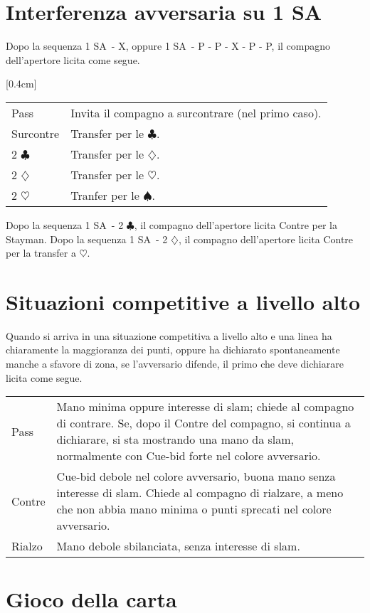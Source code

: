 \documentclass[a4paper,10pt]{article}
\renewcommand{\c}{$\clubsuit$\xspace}
\renewcommand{\d}{$\diamondsuit$\xspace}
\newcommand{\h}{$\heartsuit$\xspace}
\newcommand{\s}{$\spadesuit$\xspace}
\newcommand{\sa}{SA\xspace}
\newcommand{\smallspace}{\vskip0.3cm}
\renewcommand{\tabcolsep}{0.3cm}
\newenvironment{twocol}
  {\smallspace\noindent\begin{tabular}{l p{0.78\textwidth}}}
  {\end{tabular}\smallspace}
\newcommand{\biddingtable}[2][0.4cm]{
  \needspace{1cm}
  \marginnote{
    \scriptsize{
    \def\arraystretch{1.5}
    \renewcommand{\tabcolsep}{0.1cm}
    \begin{tabular}{|>{\centering\arraybackslash}p{0.6cm}>{\centering\arraybackslash}p{0.6cm}>{\centering\arraybackslash}p{0.6cm}>{\centering\arraybackslash}p{0.6cm}|}
      \hline
      #2
    \end{tabular}
    }
  }[#1]
}
\begin{document}
\section{Interferenza avversaria su 1 \sa}

Dopo la sequenza 1 \sa\ - X, oppure 1 \sa\ - P - P - X - P - P, il compagno dell'apertore licita come segue.

\biddingtable{1 \sa & X & * &}
\begin{twocol}
	Pass & Invita il compagno a surcontrare (nel primo caso).\\
	Surcontre & Transfer per le \c.\\
	2 \c & Transfer per le \d.\\
	2 \d & Transfer per le \h.\\
	2 \h & Tranfer per le \s.\\
\end{twocol}

Dopo la sequenza 1 \sa\ - 2 \c, il compagno dell'apertore licita Contre per la Stayman. Dopo la sequenza 1 \sa\ - 2 \d, il compagno dell'apertore licita Contre per la transfer a \h.

\section{Situazioni competitive a livello alto}

Quando si arriva in una situazione competitiva a livello alto e una linea ha chiaramente la maggioranza dei punti, oppure ha dichiarato spontaneamente manche a sfavore di zona, se l'avversario difende, il primo che deve dichiarare licita come segue.

\begin{twocol}
	Pass & Mano minima oppure interesse di slam; chiede al compagno di contrare. Se, dopo il Contre del compagno, si continua a dichiarare, si sta	mostrando una mano da slam, normalmente con Cue-bid forte nel colore avversario.\\
	Contre & Cue-bid debole nel colore avversario, buona mano senza interesse di slam. Chiede al compagno di rialzare, a meno che non abbia mano minima o punti sprecati nel colore avversario.\\
	Rialzo & Mano debole sbilanciata, senza interesse di slam. 
\end{twocol}

\pagebreak

\section{Gioco della carta}
\end{document}
